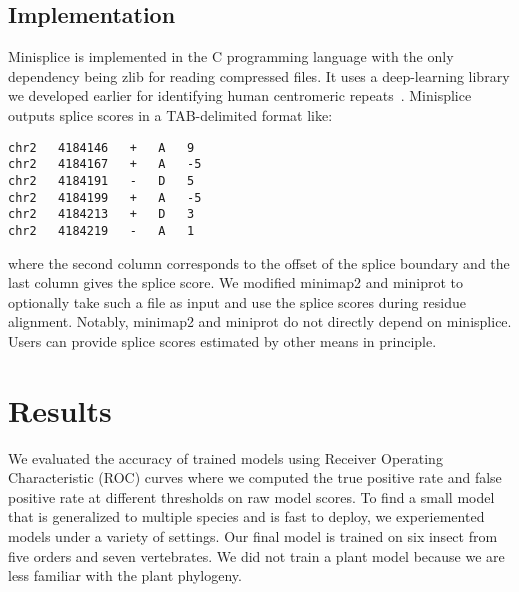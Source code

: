 \documentclass[webpdf,contemporary,large,namedate]{oup-authoring-template}%
\begin{document}
\subsection{Implementation}

Minisplice is implemented in the C programming language with the only dependency
being zlib for reading compressed files.
It uses a deep-learning library we developed earlier for identifying human centromeric repeats~\citep{Li:2019aa}.
Minisplice outputs splice scores in a TAB-delimited format like:
\begin{verbatim}
chr2   4184146   +   A   9
chr2   4184167   +   A   -5
chr2   4184191   -   D   5
chr2   4184199   +   A   -5
chr2   4184213   +   D   3
chr2   4184219   -   A   1
\end{verbatim}
where the second column corresponds to the offset of the splice boundary
and the last column gives the splice score.
We modified minimap2 and miniprot to optionally take such a file as input
and use the splice scores during residue alignment.
Notably, minimap2 and miniprot do not directly depend on minisplice.
Users can provide splice scores estimated by other means in principle.

\section{Results}

We evaluated the accuracy of trained models using Receiver Operating Characteristic (ROC) curves
where we computed the true positive rate and false positive rate at different thresholds on raw model scores.
To find a small model that is generalized to multiple species and is fast to deploy,
we experiemented models under a variety of settings.
Our final model is trained on six insect from five orders and seven vertebrates.
We did not train a plant model because we are less familiar with the plant phylogeny.
\end{document}
